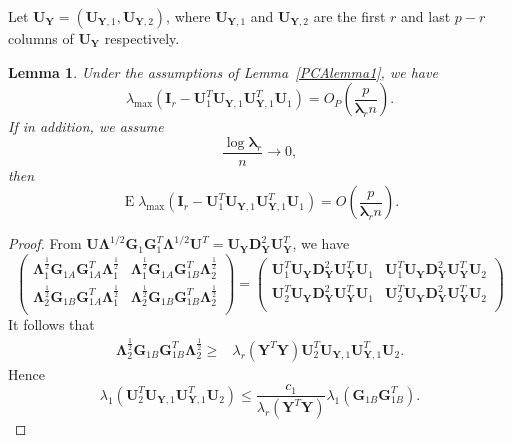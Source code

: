 \documentclass[12pt]{article} %
\DeclareMathOperator{\myE}{E}
\newcommand{\bY}{\mathbf{Y}}
\newcommand{\bG}{\mathbf{G}}
\newcommand{\bI}{\mathbf{I}}
\newcommand{\bU}{\mathbf{U}}
\newcommand{\bD}{\mathbf{D}}
\newcommand{\bfsym}[1]{\ensuremath{\boldsymbol{#1}}}
\def\blambda {\bfsym {\lambda}}
\def\bLambda {\bfsym {\Lambda}}
\newtheorem{lemma}{Lemma}
\theoremstyle{definition}
\begin{document}
Let $\bU_\bY=(\bU_{\bY,1},\bU_{\bY,2})$, where $\bU_{\bY,1}$ and $\bU_{\bY,2}$ are the first $r$ and last $p-r$ columns of $\bU_\bY$ respectively.
\begin{lemma}\label{PCAlemma2}
    Under the assumptions of Lemma~\ref{PCAlemma1}, we have
$$
\lambda_{\max}(\bI_r-\bU_1^T \bU_{\bY,1}\bU_{\bY,1}^T \bU_1)
=O_P(\frac{ p}{\blambda_r n}).
$$
If in addition, we assume
    \begin{equation}\label{newCondition}
        \frac{\log \blambda_r}{n}\to 0,
    \end{equation}
     then
$$
\myE\lambda_{\max}(\bI_r-\bU_1^T \bU_{\bY,1}\bU_{\bY,1}^T \bU_1)
=O(\frac{ p}{\blambda_r n}).
$$
\end{lemma}
\begin{proof}
    From
$
\bU\bLambda^{1/2} \bG_1 \bG_1^T \bLambda^{1/2} \bU^T 
=\bU_{\bY}\bD_{\bY}^2 \bU_{\bY}^T
$,
we have
$$
    \begin{pmatrix}        
        \bLambda_{1}^{\frac{1}{2}}\bG_{1A} \bG_{1A}^T \bLambda_1^{\frac{1}{2}}&
        \bLambda_{1}^{\frac{1}{2}} \bG_{1A}\bG_{1B}^T\bLambda_2^{\frac{1}{2}}\\
        \bLambda_{2}^{\frac{1}{2}} \bG_{1B} \bG_{1A}^T\bLambda_1^{\frac{1}{2}} &
        \bLambda_{2}^{\frac{1}{2}}\bG_{1B}\bG_{1B}^T\bLambda_2^{\frac{1}{2}}\\
    \end{pmatrix}
    =
    \begin{pmatrix}        
         \bU_1^T \bU_{\bY}\bD_{\bY}^2 \bU_{\bY}^T \bU_1&
         \bU_1^T \bU_{\bY}\bD_{\bY}^2 \bU_{\bY}^T \bU_2\\
        \bU_2^T \bU_{\bY}\bD_{\bY}^2 \bU_{\bY}^T \bU_1&
         \bU_2^T \bU_{\bY}\bD_{\bY}^2 \bU_{\bY}^T \bU_2\\
    \end{pmatrix}
$$
It follows that
$$
\begin{aligned}
 \bLambda_{2}^{\frac{1}{2}}\bG_{1B} \bG_{1B}^T  \bLambda_{2}^{\frac{1}{2}}
\geq&
    \lambda_r(\bY^T \bY) \bU_{2}^T \bU_{\bY,1}\bU_{\bY,1}^T \bU_{2}.
\end{aligned}
$$
Hence
    \begin{equation}\label{ineq:eigenvector}
\lambda_{1}(\bU_{2}^T \bU_{\bY,1} \bU_{\bY,1}^T \bU_{2})\leq
\frac{c_1}{\lambda_r(\bY^T \bY)} \lambda_{1}
(\bG_{1B} \bG_{1B}^T).
    \end{equation}

\end{proof}
\end{document}
